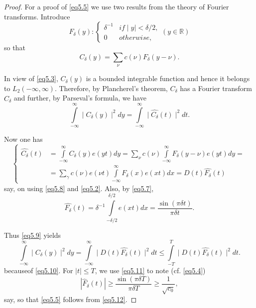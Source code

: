 \begin{proof} %
For a proof of \eqref{eq5.5} we use two results from the theory of
Fourier transforms. Introduce 
\begin{equation*}
F_\delta (y) : \begin{cases} \delta^{-1} & if \mid y \mid < \delta /
  2, \\ 0 & otherwise, \end{cases} (y \in \mathbb{R})
\tag{5.7}\label{eq5.7}  
\end{equation*}
so that
\begin{equation*}
C_\delta (y) = \sum_\nu c(\nu ) F_\delta (y - \nu ). \tag{5.8}\label{eq5.8}
\end{equation*}

In view of \eqref{eq5.3}, $C_\delta(y)$ is a bounded integrable function and
hence it belongs to $L_2(- \infty, \infty)$. Therefore, by
Plancherel's theorem, $C_\delta$ has a Fourier transform
$\hat{C}_\delta$ and further, by Parseval's formula, we have  
\begin{equation*}
\int\limits^\infty_{-\infty} \mid C_\delta (y) \mid^2 dy = \int
\limits^\infty_{-\infty} \mid \hat{C_\delta}(t) \mid^2
dt. \tag{5.9}\label{eq5.9}  
\end{equation*}

Now one has
\begin{equation*}
\begin{cases}
\hat{C_\delta}{(t)} &= \int \limits^\infty_{-\infty} C_\delta (y)e
(yt)dy = \sum_\nu c(\nu) \int \limits^\infty_{-\infty} F_\delta
(y-\nu)e (yt) dy = \\  
&= \sum_\gamma c(\nu ) e (\nu t) \int \limits^\infty_{-\infty} F_\delta (x) e
(xt)dx = D(t) \hat{F_\delta}(t) 
\end{cases}\tag{5.10} \label{eq5.10}
\end{equation*}
say, on using \eqref{eq5.8} and \eqref{eq5.2}. Also, by \eqref{eq5.7},
\begin{equation*}
\hat{F_\delta}(t) = \delta^{-1} \int\limits^{\delta/2}_{- \delta/2}
e(xt)dx = \frac{\sin (\pi \delta t)}{\pi \delta
  t}. \tag{5.11}\label{eq5.11}  
\end{equation*}

Thus \eqref{eq5.9} yields
\begin{equation*}
\int\limits^\infty_{-\infty} \mid C_\delta (y) \mid^2 dy = \int
\limits^\infty_{-\infty} \mid D(t) \hat{F_\delta}(t) \mid^2 dt \leq
\int\limits^T_{-T} \mid D(t) \hat{F_\delta}(t) \mid^2
dt. \tag{5.12}\label{eq5.12}  
\end{equation*}
because\pageoriginale of \eqref{eq5.10}. For $|t|\leq T$, we use
\eqref{eq5.11} to note (cf. \eqref{eq5.4}) 
\begin{equation*}
|\hat{F}_{\delta}(t)| \geq \frac{\sin (\pi \delta T)}{\pi \delta T}
\geq \frac{1}{\sqrt{c_0}}, \tag{5.13}\label{eq5.13} 
\end{equation*}
say, so that \eqref{eq5.5} follows from \eqref{eq5.12}.
\end{proof}

